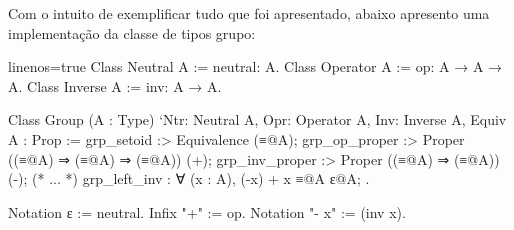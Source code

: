 Com o intuito de exemplificar tudo que foi apresentado, abaixo apresento uma implementação da classe de tipos grupo:\\
\begin{minipage}[t]{0.5\linewidth}
\begin{coqcode*}{linenos=true}
Class Neutral A := neutral: A.
Class Operator A := op: A → A → A.
Class Inverse A := inv: A → A.

Class Group (A : Type)
  `{Ntr: Neutral A, Opr: Operator A, Inv: Inverse A, Equiv A} : Prop := {
	grp_setoid :> Equivalence (≡@{A});
	grp_op_proper :> Proper ((≡@{A}) ⇒ (≡@{A}) ⇒ (≡@{A})) (+);
	grp_inv_proper :> Proper ((≡@{A}) ⇒ (≡@{A})) (-);
	(* ... *)
	grp_left_inv : ∀ (x : A), (-x) + x ≡@{A} ɛ@{A};
}.
\end{coqcode*}
\end{minipage}
\hspace{-1em}
\begin{minipage}[t]{0.5\linewidth}
\begin{coqcode}
Notation ɛ := neutral.
Infix "+" := op.
Notation "- x" := (inv x).
\end{coqcode}
\end{minipage}\vspace*{.6em}\\
